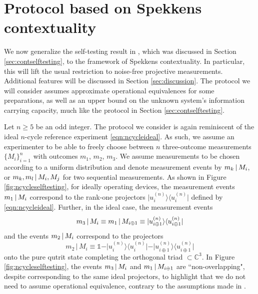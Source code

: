 \chapter{Protocol based on Spekkens contextuality}
\label{sec:protocols}
We now generalize the self-testing result in \cite{Bharti2019}, which was discussed in Section \ref{sec:contselftesting}, to the framework of Spekkens contextuality. In particular, this will lift the usual restriction to noise-free projective measurements. Additional features will be discussed in Section \ref{sec:discussion}. The protocol we will consider assumes approximate operational equivalences for some preparations, as well as an upper bound on the unknown system's information carrying capacity, much like the protocol in Section \ref{sec:contselftesting}.

Let $n\geq 5$ be an odd integer. The protocol we consider is again reminiscent of the ideal $n$-cycle reference experiment \ref{eqn:ncycleideal}. As such, we assume an experimenter to be able to freely choose between $n$ three-outcome measurements $\{M_i\}_{i=1}^n$ with outcomes $m_1$, $m_2$, $m_3$. We assume measurements to be chosen according to a uniform distribution and denote measurement events by  $m_k\thinspace\vert\thinspace M_i$, or $m_k,m_l\thinspace\vert\thinspace M_i,M_j$ for two sequential measurements. As shown in Figure \ref{fig:ncycleselftesting}, for ideally operating devices, the measurement events $m_1 \thinspace\vert\thinspace M_i$ correspond to the rank-one projectors $\vert u_i^{(n)}\rangle\langle u_i^{(n)}\vert$ defined by \ref{eqn:ncycleideal}. Further, in the ideal case, the measurement events \begin{equation*}
m_3\thinspace\vert\thinspace M_i\equiv m_1\thinspace\vert\thinspace M_{i\oplus 1}\equiv\vert u_{i\oplus 1}^{(n)}\rangle\langle u_{i\oplus 1}^{(n)}\vert
\end{equation*}and the events $m_2\thinspace\vert\thinspace M_i$ correspond to the projectors 
\begin{equation*}
m_2\,\vert\,M_i\equiv \mathbb{1}-\vert u_i^{(n)}\rangle\langle u_i^{(n)}\vert-\vert u_{i\oplus 1}^{(n)}\rangle\langle u_{i\oplus 1}^{(n)}\vert
\end{equation*} onto the pure qutrit state completing the orthogonal triad $\subset \mathbb{C}^3$. In Figure \ref{fig:ncycleselftesting}, the events $m_3\thinspace \vert\thinspace M_i$ and $m_1\thinspace\vert\thinspace M_{i\oplus 1}$ are ``non-overlapping", despite corresponding to the same ideal projectors, to highlight that we do not need to assume operational equivalence, contrary to the assumptions made in \cite{Kunjwal2019}.

